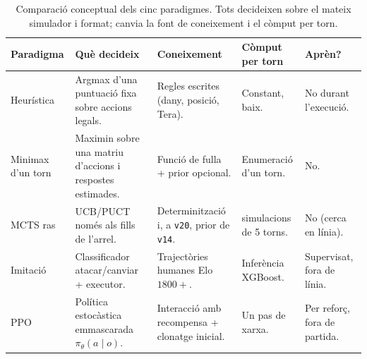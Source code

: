 \begin{table}[htbp]
\centering
\caption{Comparació conceptual dels cinc paradigmes. Tots decideixen sobre el mateix simulador i format; canvia la font de coneixement i el còmput per torn.}
\label{tab:paradigm_mechanisms}
\small
\renewcommand{\arraystretch}{1.3}
\begin{tabularx}{\textwidth}{l>{\raggedright\arraybackslash}X>{\raggedright\arraybackslash}X>{\raggedright\arraybackslash}X>{\raggedright\arraybackslash}p{2.2cm}}
\toprule
\textbf{Paradigma} & \textbf{Què decideix} & \textbf{Coneixement} & \textbf{Còmput per torn} & \textbf{Aprèn?} \\
\midrule
Heurística & Argmax d'una puntuació fixa sobre accions legals. & Regles escrites (dany, posició, Tera). & Constant, baix. & No durant l'execució. \\
\arrayrulecolor{gray!30}\hline\arrayrulecolor{black}
Minimax d'un torn & Maximin sobre una matriu d'accions i respostes estimades. & Funció de fulla + prior opcional. & Enumeració d'un torn. & No. \\
\arrayrulecolor{gray!30}\hline\arrayrulecolor{black}
MCTS ras & UCB/PUCT només als fills de l'arrel. & Determinització i, a \texttt{v20}, prior de \texttt{v14}. & 100 simulacions de 5 torns. & No (cerca en línia). \\
\arrayrulecolor{gray!30}\hline\arrayrulecolor{black}
Imitació & Classificador atacar/canviar + executor. & Trajectòries humanes Elo~$1800+$. & Inferència XGBoost. & Supervisat, fora de línia. \\
\arrayrulecolor{gray!30}\hline\arrayrulecolor{black}
PPO & Política estocàstica emmascarada $\pi_\theta(a\mid o)$. & Interacció amb recompensa + clonatge inicial. & Un pas de xarxa. & Per reforç, fora de partida. \\
\bottomrule
\end{tabularx}
\end{table}
